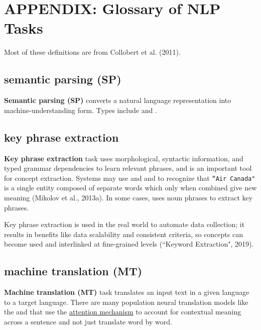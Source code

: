 \section{APPENDIX: Glossary of NLP Tasks} \label{app:Appendix_NLPTasks}

Most of these definitions are from Collobert et al. (2011). 


\subsection{semantic parsing (SP)} \label{nlptask:semanticparsingSP}

\textbf{Semantic parsing (SP)} converts a natural language representation into machine-understanding form. Types include  and .


\subsection{key phrase extraction} \label{nlptask:keyphraseextraction}

\textbf{Key phrase extraction} task uses morphological,  syntactic information, and typed grammar dependencies to learn relevant phrases, and is an important tool for concept extraction. Systems may use  and  and  to recognize that \texttt{``Air Canada"} is a single entity composed of separate words which only when combined give new meaning (Mikolov et al., 2013a). In some cases,  uses noun phrases to extract key phrases. 

Key phrase extraction is used in the real world to automate data collection; it results in benefits like data scalability and consistent criteria, so concepts can become used and interlinked at fine-grained levels (``Keyword Extraction", 2019). 



\subsection{machine translation (MT)} \label{nlptask:machinetranslationMT}

\textbf{Machine translation (MT)} task translates an input text in a given language to a target language. There are many population neural translation models like the  and  that use the \hyperref[sec:AttentionMechanism]{attention mechanism} to account for contextual meaning across a sentence and not just translate word by word. 

